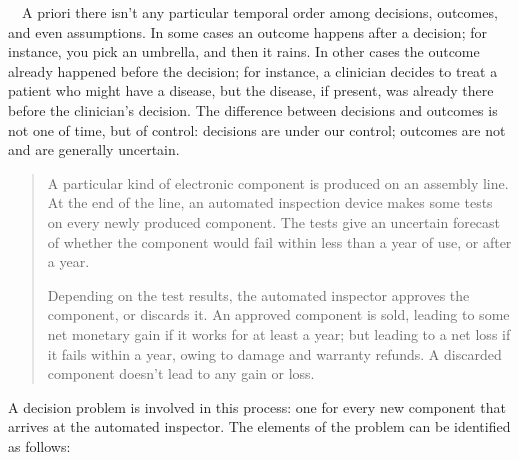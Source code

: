 \documentclass[
  a4paper,
  DIV=11,
  numbers=noendperiod,
  oneside]{scrreprt}
\begin{document}
~~A priori there isn't any particular
temporal order among decisions, outcomes, and even assumptions. In some
cases an outcome happens after a decision; for instance, you pick an
umbrella, and then it rains. In other cases the outcome already happened
before the decision; for instance, a clinician decides to treat a
patient who might have a disease, but the disease, if present, was
already there before the clinician's decision. The difference between
decisions and outcomes is not one of time, but of control: decisions are
under our control; outcomes are not and are generally uncertain.

\begin{tcolorbox}[enhanced jigsaw, titlerule=0mm, toprule=.15mm, toptitle=1mm, bottomrule=.15mm, leftrule=.75mm, title={Example}, arc=.35mm, breakable, left=2mm, coltitle=black, colframe=quarto-callout-note-color-frame, colbacktitle=quarto-callout-note-color!10!white, bottomtitle=1mm, rightrule=.15mm, opacitybacktitle=0.6, opacityback=0, colback=white]

\begin{quote}
A particular kind of electronic component is produced on an assembly
line. At the end of the line, an automated inspection device makes some
tests on every newly produced component. The tests give an uncertain
forecast of whether the component would fail within less than a year of
use, or after a year.

Depending on the test results, the automated inspector approves the
component, or discards it. An approved component is sold, leading to
some net monetary gain if it works for at least a year; but leading to a
net loss if it fails within a year, owing to damage and warranty
refunds. A discarded component doesn't lead to any gain or loss.\\
\end{quote}

A decision problem is involved in this process: one for every new
component that arrives at the automated inspector. The elements of the
problem can be identified as follows:


\end{tcolorbox}
\end{document}
